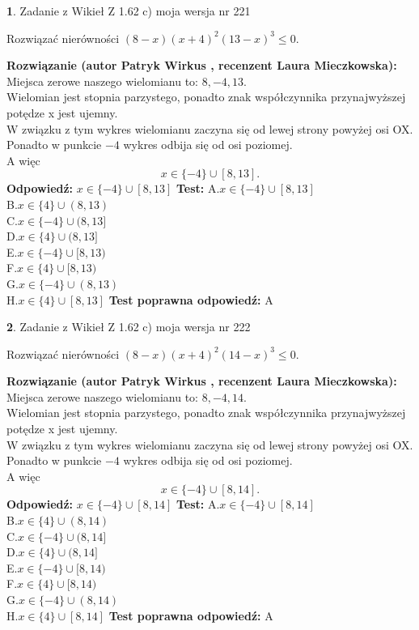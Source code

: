 \documentclass[12pt, a4paper]{article}
\theoremstyle{definition} %
\newtheorem{zad}{}
\newcommand{\zadStart}[1]{\begin{zad}#1\newline}
\newcommand{\zadStop}{\end{zad}}
\newcommand{\rozwStart}[2]{\noindent \textbf{Rozwiązanie (autor #1 , recenzent #2): }\newline}
\newcommand{\rozwStop}{\newline}
\newcommand{\odpStart}{\noindent \textbf{Odpowiedź:}\newline}
\newcommand{\odpStop}{\newline}
\newcommand{\testStart}{\noindent \textbf{Test:}\newline}
\newcommand{\testStop}{\newline}
\newcommand{\kluczStart}{\noindent \textbf{Test poprawna odpowiedź:}\newline}
\newcommand{\kluczStop}{\newline}
\begin{document}
\zadStart{Zadanie z Wikieł Z 1.62 c) moja wersja nr 221}

Rozwiązać nierówności $(8-x)(x+4)^{2}(13-x)^{3}\le0$.
\zadStop
\rozwStart{Patryk Wirkus}{Laura Mieczkowska}
Miejsca zerowe naszego wielomianu to: $8, -4, 13$.\\
Wielomian jest stopnia parzystego, ponadto znak współczynnika przy\linebreak najwyższej potędze x jest ujemny.\\ W związku z tym wykres wielomianu zaczyna się od lewej strony powyżej osi OX.\\
Ponadto w punkcie $-4$ wykres odbija się od osi poziomej.\\
A więc $$x \in \{-4\} \cup [8,13].$$
\rozwStop
\odpStart
$x \in \{-4\} \cup [8,13]$
\odpStop
\testStart
A.$x \in \{-4\} \cup [8,13]$\\
B.$x \in \{4\} \cup (8,13)$\\
C.$x \in \{-4\} \cup (8,13]$\\
D.$x \in \{4\} \cup (8,13]$\\
E.$x \in \{-4\} \cup [8,13)$\\
F.$x \in \{4\} \cup [8,13)$\\
G.$x \in \{-4\} \cup (8,13)$\\
H.$x \in \{4\} \cup [8,13]$
\testStop
\kluczStart
A
\kluczStop



\zadStart{Zadanie z Wikieł Z 1.62 c) moja wersja nr 222}

Rozwiązać nierówności $(8-x)(x+4)^{2}(14-x)^{3}\le0$.
\zadStop
\rozwStart{Patryk Wirkus}{Laura Mieczkowska}
Miejsca zerowe naszego wielomianu to: $8, -4, 14$.\\
Wielomian jest stopnia parzystego, ponadto znak współczynnika przy\linebreak najwyższej potędze x jest ujemny.\\ W związku z tym wykres wielomianu zaczyna się od lewej strony powyżej osi OX.\\
Ponadto w punkcie $-4$ wykres odbija się od osi poziomej.\\
A więc $$x \in \{-4\} \cup [8,14].$$
\rozwStop
\odpStart
$x \in \{-4\} \cup [8,14]$
\odpStop
\testStart
A.$x \in \{-4\} \cup [8,14]$\\
B.$x \in \{4\} \cup (8,14)$\\
C.$x \in \{-4\} \cup (8,14]$\\
D.$x \in \{4\} \cup (8,14]$\\
E.$x \in \{-4\} \cup [8,14)$\\
F.$x \in \{4\} \cup [8,14)$\\
G.$x \in \{-4\} \cup (8,14)$\\
H.$x \in \{4\} \cup [8,14]$
\testStop
\kluczStart
A
\kluczStop
\end{document}
